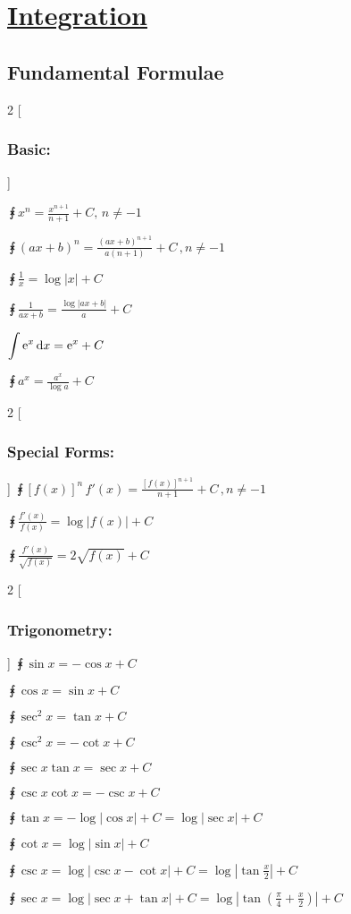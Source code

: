\documentclass[Math.tex]{subfiles}
\begin{document}
\section*{\centering\huge\underline{Integration}}
\subsection*{Fundamental Formulae}

\begin{multicols}{2}
[\subsubsection*{Basic:}]

$\intx{x^n} = \frac{x^{n+1}}{n+1}+C,\, n\neq -1$

$\intx{(ax+b)^n} = \frac{(ax+b)^{n+1}}{a(n+1)} + C\,, n\neq -1$

$\intx{\frac{1}{x}} = \log|x| + C$

$\intx{\frac{1}{ax+b}} = \frac{\log|ax+b|}{a} + C$

$\displaystyle\int\displaystyle\mathrm{e}^x\,\mathrm{d}x = \displaystyle\mathrm{e}^x + C$

$\intx{a^x}= \frac{a^x}{\log a} + C$
\end{multicols}

\begin{multicols}{2}
[\subsubsection*{Special Forms:}]
$\intx{\left[f(x)\right]^n\,f'(x)} = \frac{\left[f(x)\right]^{n + 1}}{n + 1} + C\,, n\neq -1$

$\intx{\frac{f'(x)}{f(x)}} = \log|f(x)| + C$

$\intx{\frac{f'(x)}{\sqrt{f(x)}}} = 2\sqrt{f{(x)}} + C$
\end{multicols}
\begin{multicols}{2}
[\subsubsection*{Trigonometry:}]
$ \intx{\sin x} = -\cos x + C $

$ \intx{\cos x} = \sin x  + C $

$ \intx{\sec ^2 x} = \tan x + C $

$ \intx{\csc ^2 x} = -\cot x + C $

$ \intx{\sec x\tan x} = \sec x + C $

$ \intx{\csc x\cot x} = -\csc x + C $

$ \intx{\tan x} = -\log |\cos x| + C = \log| \sec x| + C $

$ \intx{\cot x} = \log |\sin x| + C $

$ \intx{\csc x} = \log|\csc x - \cot x| + C = \log\left|\tan\frac{x}{2}\right| + C $
\end{multicols}
$ \intx{\sec x} = \log|\sec x + \tan x| + C = \log\left|\tan\left(\frac{\pi}{4} + \frac{x}{2}\right)\right| + C $
\end{document}
